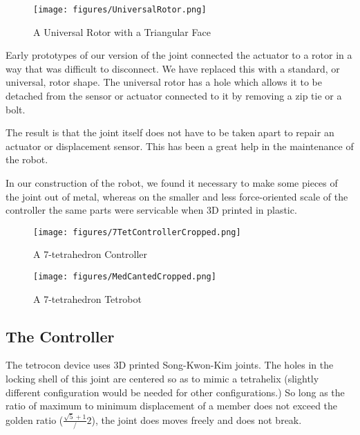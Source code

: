 \documentclass[conference]{IEEEtran}
\begin{document}
 \begin{figure}
  \centering
  \texttt{[image: figures/UniversalRotor.png]}
    \caption[A Universal Rotor with a Triangular Face]{A Universal Rotor with a Triangular Face}
      \label{fig:UniversalController}
\end{figure}

 Early prototypes of our version of the joint connected the actuator to a rotor in a way
 that was difficult to disconnect. We have replaced this with a standard, or universal,
 rotor shape. The universal rotor has a hole which allows it to be detached from the
 sensor or actuator connected to it by removing a zip tie or a bolt.

 The result is that the joint itself does not have to be taken apart to repair an actuator
 or displacement sensor.
 This has been a great help in the maintenance of the robot.

 In our construction of the robot, we found it necessary to make some pieces of the joint
 out of metal, whereas on the smaller and less force-oriented scale of the controller the
 same parts were servicable when 3D printed in plastic.






\begin{figure}
  \centering
  \texttt{[image: figures/7TetControllerCropped.png]}
    \caption[A 7-tetrahedron Controller]{A 7-tetrahedron Controller}
      \label{fig:7tetcontroller}
\end{figure}

\begin{figure}
  \centering
  \texttt{[image: figures/MedCantedCropped.png]}
    \caption[A 7-tetrahedron Robot]{A 7-tetrahedron Tetrobot}
      \label{fig:7tetrobot}
\end{figure}



 \subsection{The Controller}

 The tetrocon device uses 3D printed Song-Kwon-Kim joints. The holes in
 the locking shell of this joint are centered so as to mimic a tetrahelix
 (slightly different configuration would be needed for other configurations.)
 So long as the ratio of maximum to minimum displacement of a member does not
 exceed the golden ratio ($\frac{\sqrt{5} + 1}/2$), the joint does moves
 freely and does not break.
\end{document}
